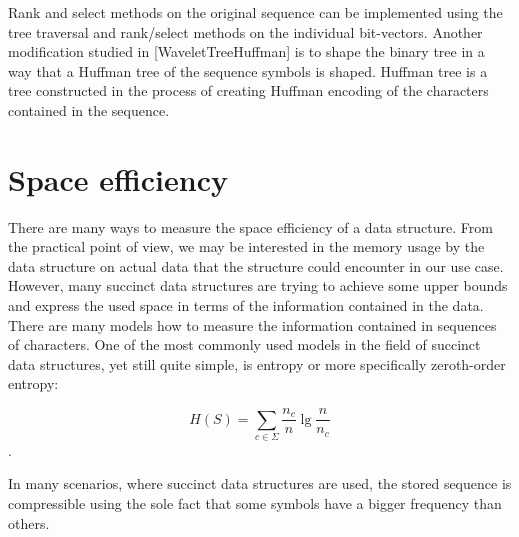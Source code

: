 Rank and select methods on the original sequence can be implemented using the tree
traversal and rank/select methods on the individual bit-vectors. Another modification
studied in [WaveletTreeHuffman] is to shape the binary tree in a way that a Huffman
tree of the sequence symbols is shaped. Huffman tree is a tree constructed in the
process of creating Huffman encoding of the characters contained in the sequence.

\section{Space efficiency}

There are many ways to measure the space efficiency of a data structure. From the
practical point of view, we may be interested in the memory usage by the data
structure on actual data that the structure could encounter in our use case. However,
many succinct data structures are trying to achieve some upper bounds and express
the used space in terms of the information contained in the data. There are many
models how to measure the information contained in sequences of characters. One
of the most commonly used models in the field of succinct data structures, yet still
quite simple, is entropy or more specifically zeroth-order entropy:

$$H(S)=\sum_{c\in\Sigma} \frac{n_c}{n} \lg \frac{n}{n_c}$$.

In many scenarios, where succinct data structures are used, the stored sequence
is compressible using the sole fact that some symbols have a bigger frequency than others.